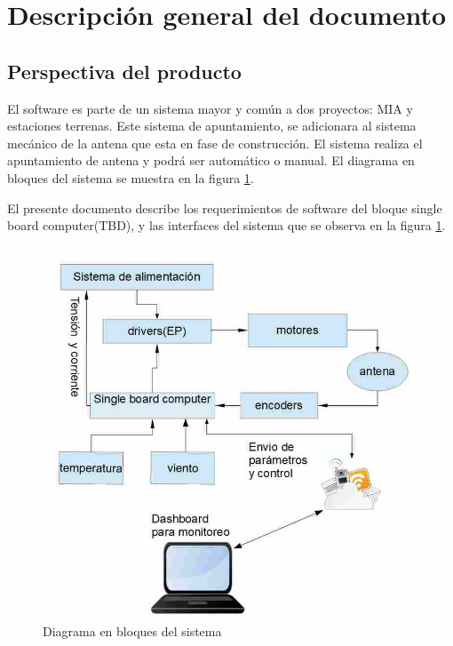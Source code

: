 \documentclass[12pt,a4paper, twosite]{article}
\begin{document}
	
	\section{Descripción general del documento}
	\label{sec:orgc1c4017}
	
	\subsection{Perspectiva del producto}
	\label{sec:org24980a8}
	El software es parte de un sistema mayor y común a dos proyectos: MIA y estaciones terrenas. Este sistema de apuntamiento, se adicionara al sistema mecánico de la antena que esta en fase de construcción. El sistema realiza el apuntamiento de antena y podrá ser automático o manual. El diagrama en bloques del sistema se muestra en la figura \ref{fig:diagramaBloques}. 
	
	 El presente documento describe los requerimientos de software del bloque single board computer(TBD), y las interfaces del sistema que se observa en la figura  \ref{fig:diagramaBloques}. 
	\begin{figure}[h!]
		\centering
		\includegraphics[scale=0.5]{bloquesInt.jpg}
		\caption{Diagrama en bloques del sistema}
		\label{fig:diagramaBloques}
	\end{figure}
\end{document}
